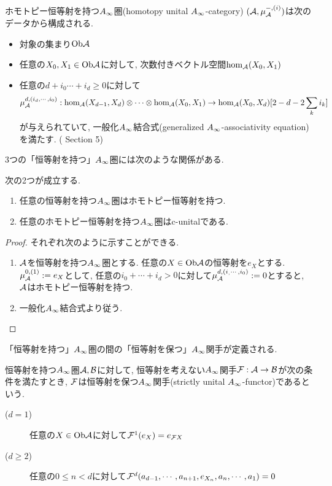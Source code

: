\documentclass[uplatex, a4paper, 14Q, dvipdfmx]{jsarticle}
\begin{document}
\begin{definition}
  ホモトピー恒等射を持つ$A_{\infty}$圏(homotopy unital $A_{\infty}$-category) $(\mathcal{A},\mu^{-,(i)}_{\mathcal{A}})$は次のデータから構成される. 
  \begin{itemize}
    \item 対象の集まり$\mathrm{Ob}\mathcal{A}$ 
    \item 任意の$X_0, X_1 \in \mathrm{Ob}\mathcal{A}$に対して, 次数付きベクトル空間$\hom_{\mathcal{A}}(X_0,X_1)$
    \item 任意の$d+i_0\cdots+i_d \geq 0$に対して
    \begin{align*}
      \mu^{d,(i_d,\cdots,i_0)}_{\mathcal{A}} : \hom_{\mathcal{A}}(X_{d-1},X_d) \otimes \cdots \otimes \hom_{\mathcal{A}}(X_0,X_1) \to \hom_{\mathcal{A}}(X_0,X_d)[2-d-2\sum_{k}i_k]
    \end{align*}
    が与えられていて, 一般化$A_{\infty}$結合式(generalized $A_{\infty}$-associativity equation)を満たす. (\cite{Fuk02} Section 5)
  \end{itemize}
\end{definition}

3つの「恒等射を持つ」$A_{\infty}$圏には次のような関係がある. 

\begin{lemma}
  次の2つが成立する. 
  \begin{enumerate}
    \item 任意の恒等射を持つ$A_{\infty}$圏はホモトピー恒等射を持つ. 
    \item 任意のホモトピー恒等射を持つ$A_{\infty}$圏はc-unitalである.
  \end{enumerate}
\end{lemma}

\begin{proof}
  それぞれ次のように示すことができる. 
  \begin{enumerate}
    \item $\mathcal{A}$を恒等射を持つ$A_{\infty}$圏とする. 
    任意の$X \in \mathrm{Ob}\mathcal{A}$の恒等射を$e_X$とする. 
    $\mu^{0,(1)}_{\mathcal{A}} := e_X$として, 任意の$i_0+\cdots+i_d>0$に対して$\mu^{d,(i_,\cdots,i_0)}_{\mathcal{A}} := 0$とすると, $\mathcal{A}$はホモトピー恒等射を持つ. 
    \item 一般化$A_{\infty}$結合式より従う. 
  \end{enumerate}
\end{proof}

「恒等射を持つ」$A_{\infty}$圏の間の「恒等射を保つ」$A_{\infty}$関手が定義される. 

\begin{definition}
  恒等射を持つ$A_{\infty}$圏$\mathcal{A},\mathcal{B}$に対して, 恒等射を考えない$A_{\infty}$関手$\mathcal{F} : \mathcal{A} \to \mathcal{B}$が次の条件を満たすとき, $\mathcal{F}$は恒等射を保つ$A_{\infty}$関手(strictly unital $A_{\infty}$-functor)であるという. 
  \begin{description}
    \item[($d=1$)] 任意の$X \in \mathrm{Ob}\mathcal{A}$に対して$\mathcal{F}^1(e_X)= e_{\mathcal{F} X}$
    \item[($d \geq 2$)] 任意の$0 \leq n < d$に対して$\mathcal{F}^d(a_{d-1},\cdots,a_{n+1},e_{X_n},a_n,\cdots,a_1) = 0$
  \end{description}
\end{definition}
\end{document}
